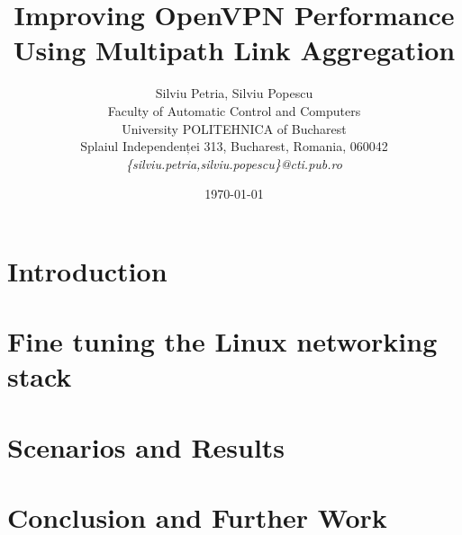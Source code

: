 \documentclass[12pt]{article}
\title{Improving OpenVPN Performance Using Multipath Link Aggregation}
\author{Silviu Petria, Silviu Popescu\\
Faculty of Automatic Control and Computers\\
University POLITEHNICA of Bucharest\\
Splaiul Independenței 313, Bucharest, Romania, 060042 \\
\emph{\{silviu.petria,silviu.popescu\}@cti.pub.ro}}
\date{\today}
\begin{document}
\maketitle

\begin{abstract}

\end{abstract}

\section{Introduction}
\label{sec:introduction}


\section{Fine tuning the Linux networking stack}
\label{sec:tuning}


\section{Scenarios and Results}
\label{sec:results}


\section{Conclusion and Further Work}
\label{sec:conclusion}




\end{document}

